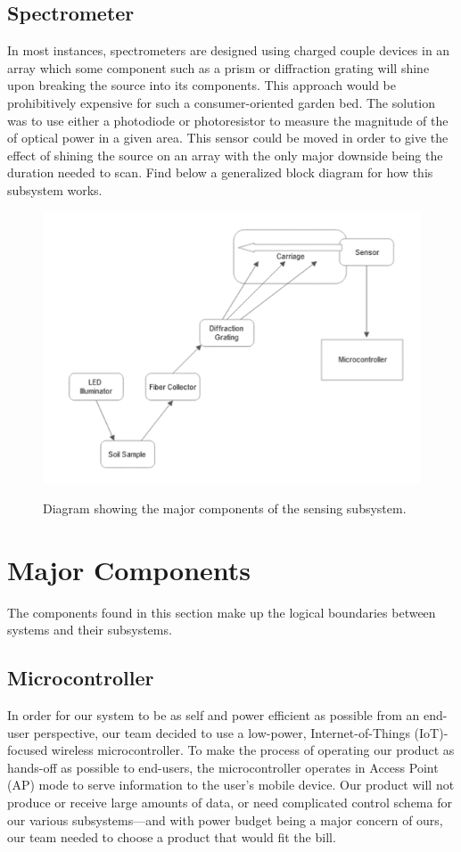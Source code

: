 \documentclass[journal]{IEEEtran}
\begin{document}
\subsection{Spectrometer} 
In most instances, spectrometers are designed using charged couple devices in an array which some
component such as a prism or diffraction grating will shine upon breaking the source into its
components. This approach would be prohibitively expensive for such a consumer-oriented garden
bed. The solution was to use either a photodiode or photoresistor to measure the magnitude of the
of optical power in a given area\cite{Cao}. This sensor could be moved in order to give the effect of shining
the source on an array with the only major downside being the duration needed to scan. Find below a
generalized block diagram for how this subsystem works.
\begin{figure}[H]
	\centering
	\includegraphics[width=\linewidth]{images/OpticsBlockDiagram.png}
	\label{fig:sensing-block}
	\caption{Diagram showing the major components of the sensing subsystem.}
\end{figure}
\section{Major Components} \label{sec:major-components}
The components found in this section make up the logical boundaries between systems and their
subsystems.
\subsection{Microcontroller}
In order for our system to be as self and power efficient as possible from an end-user perspective, our team decided to use a low-power, Internet-of-Things (IoT)-focused wireless microcontroller. To make the process of operating our product as hands-off as possible to end-users, the microcontroller operates in Access Point (AP) mode to serve information to the user's mobile device. Our product will not produce or receive large amounts of data, or need complicated control schema for our various subsystems---and with power budget being a major concern of ours, our team needed to choose a product that would fit the bill.
\end{document}
